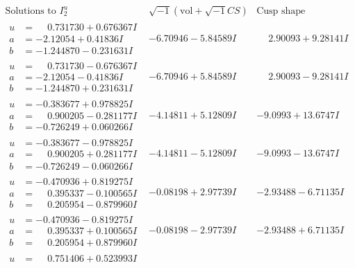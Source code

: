 \documentclass[1p]{elsarticle_modified}
\theoremstyle{definition}
\newcommand{\I}{\sqrt{-1}}
\begin{document}
$$\begin{array}{c|c|c}  
\text{Solutions to }I^u_{2}& \I (\text{vol} + \sqrt{-1}CS) & \text{Cusp shape}\\
 \hline 
\begin{aligned}
u &= \phantom{-}0.731730 + 0.676367 I \\
a &= -2.12054 + 0.41836 I \\
b &= -1.244870 - 0.231631 I\end{aligned}
 & -6.70946 - 5.84589 I & \phantom{-}2.90093 + 9.28141 I \\ \hline\begin{aligned}
u &= \phantom{-}0.731730 - 0.676367 I \\
a &= -2.12054 - 0.41836 I \\
b &= -1.244870 + 0.231631 I\end{aligned}
 & -6.70946 + 5.84589 I & \phantom{-}2.90093 - 9.28141 I \\ \hline\begin{aligned}
u &= -0.383677 + 0.978825 I \\
a &= \phantom{-}0.900205 - 0.281177 I \\
b &= -0.726249 + 0.060266 I\end{aligned}
 & -4.14811 + 5.12809 I & -9.0993 + 13.6747 I \\ \hline\begin{aligned}
u &= -0.383677 - 0.978825 I \\
a &= \phantom{-}0.900205 + 0.281177 I \\
b &= -0.726249 - 0.060266 I\end{aligned}
 & -4.14811 - 5.12809 I & -9.0993 - 13.6747 I \\ \hline\begin{aligned}
u &= -0.470936 + 0.819275 I \\
a &= \phantom{-}0.395337 - 0.100565 I \\
b &= \phantom{-}0.205954 - 0.879960 I\end{aligned}
 & -0.08198 + 2.97739 I & -2.93488 - 6.71135 I \\ \hline\begin{aligned}
u &= -0.470936 - 0.819275 I \\
a &= \phantom{-}0.395337 + 0.100565 I \\
b &= \phantom{-}0.205954 + 0.879960 I\end{aligned}
 & -0.08198 - 2.97739 I & -2.93488 + 6.71135 I \\ \hline\begin{aligned}
u &= \phantom{-}0.751406 + 0.523993 I \\

\end{aligned}
\end{array}$$
\end{document}
